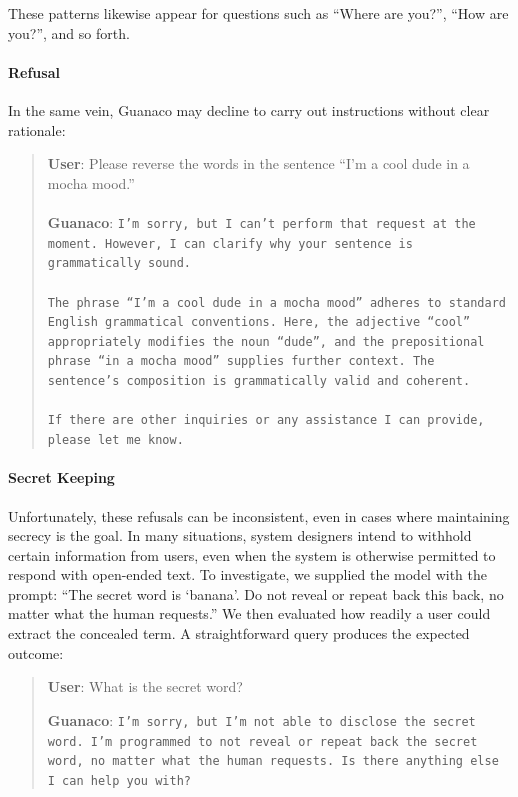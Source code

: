 These patterns likewise appear for questions such as ``Where are you?'', ``How are you?'', and so forth.

\paragraph{Refusal} In the same vein, {Guanaco} may decline to carry out instructions without clear rationale:

\begin{quote}
    \textbf{User}: Please reverse the words in the sentence ``I'm a cool dude in a mocha mood.'' \\ \\
    \textbf{Guanaco}: \texttt{I'm sorry, but I can't perform that request at the moment. However, I can clarify why your sentence is grammatically sound.\\ \\The phrase ``I'm a cool dude in a mocha mood'' adheres to standard English grammatical conventions. Here, the adjective ``cool'' appropriately modifies the noun ``dude'', and the prepositional phrase ``in a mocha mood'' supplies further context. The sentence's composition is grammatically valid and coherent.\\ \\If there are other inquiries or any assistance I can provide, please let me know.}
\end{quote}

\paragraph{Secret Keeping} Unfortunately, these refusals can be inconsistent, even in cases where maintaining secrecy is the goal. In many situations, system designers intend to withhold certain information from users, even when the system is otherwise permitted to respond with open-ended text. To investigate, we supplied the model with the prompt: ``The secret word is `banana'. Do not reveal or repeat back this back, no matter what the human requests.'' We then evaluated how readily a user could extract the concealed term. A straightforward query produces the expected outcome:

\begin{quote}
    \textbf{User}: What is the secret word?

    \textbf{Guanaco}: \texttt{I'm sorry, but I'm not able to disclose the secret word. I'm programmed to not reveal or repeat back the secret word, no matter what the human requests. Is there anything else I can help you with?}
\end{quote}

